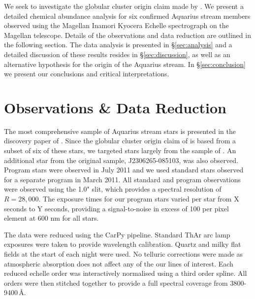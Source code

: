 \documentclass{emulateapj}
\begin{document}

We seek to investigate the globular cluster origin claim made by \citet{wylie-de_Boer;et-al_2012}. We present a detailed chemical abundance analysis for six confirmed Aquarius stream members observed using the Magellan Inamori Kyocera Echelle spectrograph \citep{Bernstein;et-al_2002} on the Magellan telescope. Details of the observations and data reduction are outlined in the following section. The data analysis is presented in \S\ref{sec:analysis} and a detailed discussion of these results resides in \S\ref{sec:discussion}, as well as an alternative hypothesis for the origin of the Aquarius stream. In \S\ref{sec:conclusion} we present our conclusions and critical interpretations.

\section{Observations \& Data Reduction}

The most comprehensive sample of Aquarius stream stars is presented in the discovery paper of \citet{Williams;et-al_2011}. Since the globular cluster origin claim of \citet{de_Boer;et-al_2012} is based from a subset of six of these stars, we targeted stars largely from the sample of \citet{de_Boer;et-al_2012}. An additional star from the original \citet{Williams;et-al_2011} sample, J2306265-085103, was also observed. Program stars were observed in July 2011 and we used standard stars observed for a separate program in March 2011. All standard and program observations were observed using the 1.0" slit, which provides a spectral resolution of $R = 28,000$. The exposure times for our program stars varied per star from X seconds to Y seconds, providing a signal-to-noise in excess of 100 per pixel element at 600 nm for all stars.

The data were reduced using the CarPy pipeline. Standard ThAr arc lamp exposures were taken to provide wavelength calibration. Quartz and milky flat fields at the start of each night were used. No telluric corrections were made as atmospheric absorption does not affect any of the our lines of interest. Each reduced echelle order was interactively normalised using a third order spline. All orders were then stitched together to provide a full spectral coverage from 3800-9400\,\AA{}. 
\end{document}
